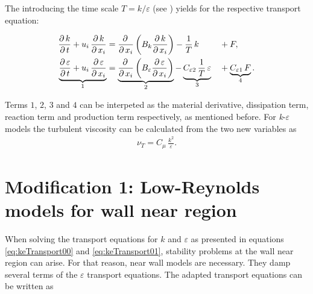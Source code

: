 \noii The introducing the time scale $T = k/\varepsilon$ (see \citep{adams2015}) yields for the respective transport equation:

\begin{alignat}{3} \label{eq:keTransport00}
		\frac{\partial\,k}{\partial\,t} + u_i\,\frac{\partial\,k}{\partial\,x_i}
		&=
		\frac{\partial\,}{\partial\,x_i}\left(  B_k \frac{\partial\,k}{\partial\,x_i} \right) 
		-
		\frac{1}{T}\,k
		&&+
		F, \\ \label{eq:keTransport01}
		\underbrace{\frac{\partial\,\varepsilon}{\partial\,t} + u_i\,\frac{\partial\,\varepsilon}{\partial\,x_i}}_{1}
		&=
		\underbrace{\frac{\partial\,}{\partial\,x_i}\left( B_\varepsilon \frac{\partial\,\varepsilon}{\partial\,x_i} \right)}_{2} 
		-
		\underbrace{C_{\varepsilon 2}\,\frac{1}{T}\,\varepsilon}_{3}
		&&+
		\underbrace{C_{\varepsilon 1}\,F}_{4}.
\end{alignat}

\noii Terms $1$, $2$, $3$ and $4$ can be interpeted as the material derivative, dissipation term, reaction term and production term respectively, as mentioned before. For \textit{k}-$\varepsilon$ models the turbulent viscosity can be calculated from the two new variables as
\begin{align}
	\nu_T = C_\mu\,\frac{k^2}{\varepsilon}.
\end{align}





\section{Modification 1: Low-Reynolds models for wall near region} %
\label{sec:modification_1_low_reynolds_models_for_wall_near_region}


When solving the transport equations for $k$ and $\varepsilon$ as presented in equations \eqref{eq:keTransport00} and \eqref{eq:keTransport01}, stability problems at the wall near region can arise. For that reason, near wall models are necessary. They damp several terms of the $\varepsilon$ transport equations. The adapted transport equations can be written as

